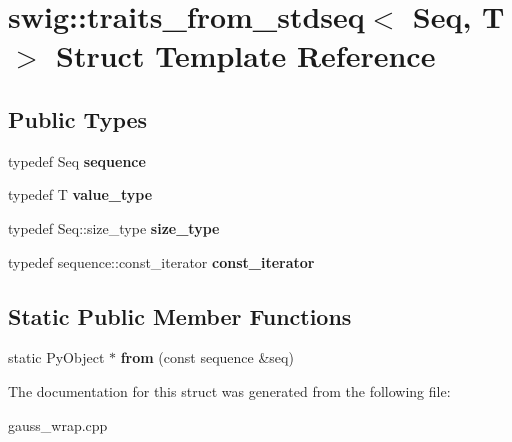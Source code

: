 \hypertarget{structswig_1_1traits__from__stdseq}{\section{swig\-:\-:traits\-\_\-from\-\_\-stdseq$<$ Seq, T $>$ Struct Template Reference}
\label{structswig_1_1traits__from__stdseq}
}
\subsection*{Public Types}
\begin{DoxyCompactItemize}
\item 
\hypertarget{structswig_1_1traits__from__stdseq_ad784f89c80055794b0da097a644ab7ab}{typedef Seq {\bfseries sequence}}\label{structswig_1_1traits__from__stdseq_ad784f89c80055794b0da097a644ab7ab}

\item 
\hypertarget{structswig_1_1traits__from__stdseq_a2159701c1eaadbf75d9b3014fea48706}{typedef T {\bfseries value\-\_\-type}}\label{structswig_1_1traits__from__stdseq_a2159701c1eaadbf75d9b3014fea48706}

\item 
\hypertarget{structswig_1_1traits__from__stdseq_a1189d4a7cea9e522a7c10ed7ff2ce232}{typedef Seq\-::size\-\_\-type {\bfseries size\-\_\-type}}\label{structswig_1_1traits__from__stdseq_a1189d4a7cea9e522a7c10ed7ff2ce232}

\item 
\hypertarget{structswig_1_1traits__from__stdseq_ab1c085e18d48f5f0afe549b4dc885290}{typedef sequence\-::const\-\_\-iterator {\bfseries const\-\_\-iterator}}\label{structswig_1_1traits__from__stdseq_ab1c085e18d48f5f0afe549b4dc885290}

\end{DoxyCompactItemize}
\subsection*{Static Public Member Functions}
\begin{DoxyCompactItemize}
\item 
\hypertarget{structswig_1_1traits__from__stdseq_ab65e9ff3dbb76a137536483c6121584b}{static Py\-Object $\ast$ {\bfseries from} (const sequence \&seq)}\label{structswig_1_1traits__from__stdseq_ab65e9ff3dbb76a137536483c6121584b}

\end{DoxyCompactItemize}


The documentation for this struct was generated from the following file\-:\begin{DoxyCompactItemize}
\item 
gauss\-\_\-wrap.\-cpp\end{DoxyCompactItemize}
